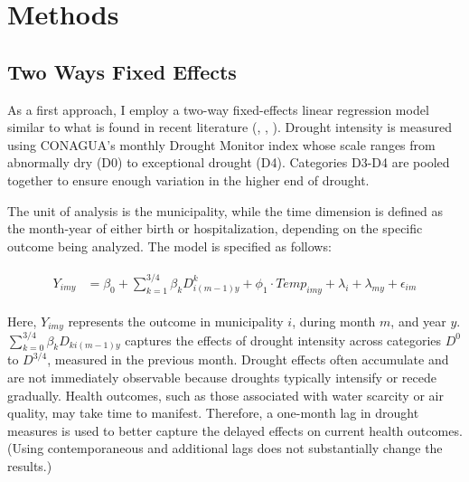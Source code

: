\documentclass[12pt, oneside]{article}      %
\begin{document}
\section{Methods}

\subsection{Two Ways Fixed Effects}
As a first approach, I employ a two-way fixed-effects linear regression model similar to what is found in recent literature (\cite{Bailey2015}, \cite{Mullins2020}, \cite{Cohen2022}). Drought intensity is measured using CONAGUA's monthly Drought Monitor index whose scale ranges from abnormally dry (D0) to exceptional drought (D4). Categories D3-D4 are pooled together to ensure enough variation in the higher end of drought.

The unit of analysis is the municipality, while the time dimension is defined as the month-year of either birth or hospitalization, depending on the specific outcome being analyzed. The model is specified as follows:

\begin{align}
\begin{aligned}
Y_{imy} &= \beta_0 + \sum_{k=1}^{3/4} \beta_k D^k_{i(m-1)y} + \phi_1 \cdot Temp_{imy} + \lambda_i + \lambda_{my} + \epsilon_{im}
\end{aligned}
\label{eq:temp_regression}
\end{align}


Here, $Y_{imy}$ represents the outcome in municipality $i$, during month $m$, and year $y$.  $\sum_{k=0}^{3/4} \beta_k D_{ki(m-1)y}$ captures the effects of drought intensity across categories $D^0$ to $D^{3/4}$, measured in the previous month. Drought effects often accumulate and are not immediately observable because droughts typically intensify or recede gradually. Health outcomes, such as those associated with water scarcity or air quality, may take time to manifest. Therefore, a one-month lag in drought measures is used to better capture the delayed effects on current health outcomes. (Using contemporaneous and additional lags does not substantially change the results.)
\end{document}
